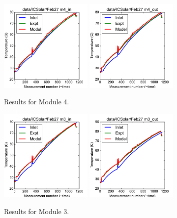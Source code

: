 \documentclass{article}
\begin{document}
\clearpage
\begin{figure}[!ht]
\centering
\includegraphics[width=0.4\textwidth]{../../data/ICSolar/images/Feb27_m4_in.pdf}\hspace{0.05\textwidth}
\includegraphics[width=0.4\textwidth]{../../data/ICSolar/images/Feb27_m4_out.pdf}\hspace{0.05\textwidth}\\
\caption{Results for Module 4.}\end{figure}
\begin{figure}[!ht]
\centering
\includegraphics[width=0.4\textwidth]{../../data/ICSolar/images/Feb27_m3_in.pdf}\hspace{0.05\textwidth}
\includegraphics[width=0.4\textwidth]{../../data/ICSolar/images/Feb27_m3_out.pdf}\hspace{0.05\textwidth}\\
\caption{Results for Module 3.}\end{figure}
\end{document}
